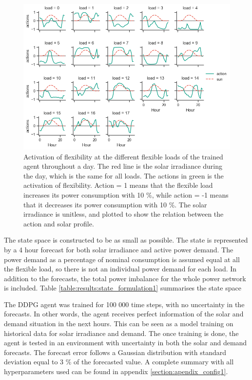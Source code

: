 \documentclass[class=book, crop=false, 11pt]{standalone}
\begin{document}
\begin{figure}[h]
    \center
    \includegraphics[scale=0.7]{figures/configuration1.png}
    \caption {Activation of flexibility at the different flexible loads of the trained agent throughout a day. The red line is the solar irradiance during the day, which is the same for all loads. The actions in green is the activation of flexibility. Action = 1 means that the flexible load increases its power consumption with 10 \%, while action = -1 means that it decreases its power consumption with 10 \%. The solar irradiance is unitless, and plotted to show the relation between the action and solar profile.}
    \label{fig:results:configuration1}
\end{figure}

The state space is constructed to be as small as possible. The state is represented by a 4 hour forecast for both solar irradiance and active power demand. The power demand as a percentage of nominal consumption is assumed equal at all the flexible load, so there is not an individual power demand for each load. In addition to the forecasts, the total power imbalance for the whole power network is included. Table \ref{table:results:state_formulation1} summarises the state space

The DDPG agent was trained for 100 000 time steps, with no uncertainty in the forecasts. In other words, the agent receives perfect information of the solar and demand situation in the next hours. This can be seen as a model training on historical data for solar irradiance and demand. The once training is done, the agent is tested in an environment with uncertainty in both the solar and demand forecasts. The forecast error follows a Gaussian distribution with standard deviation equal to 3 \% of the forecasted value. A complete summary with all hyperparameters used can be found in appendix \ref{section:apendix_config1}.
\end{document}
